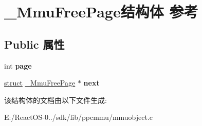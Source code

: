 \hypertarget{struct___mmu_free_page}{}\section{\+\_\+\+Mmu\+Free\+Page结构体 参考}
\label{struct___mmu_free_page}
\subsection*{Public 属性}
\begin{DoxyCompactItemize}
\item 
\mbox{\label{struct___mmu_free_page_a0aa23e84f3d4342f02e32e3aede378ad}} 
int {\bfseries page}
\item 
\mbox{\label{struct___mmu_free_page_a601b8986bc9a6c1f2920f4b3332afea8}} 
\hyperlink{interfacestruct}{struct} \hyperlink{struct___mmu_free_page}{\+\_\+\+Mmu\+Free\+Page} $\ast$ {\bfseries next}
\end{DoxyCompactItemize}


该结构体的文档由以下文件生成\+:\begin{DoxyCompactItemize}
\item 
E\+:/\+React\+O\+S-\/0../sdk/lib/ppcmmu/mmuobject.\+c\end{DoxyCompactItemize}
